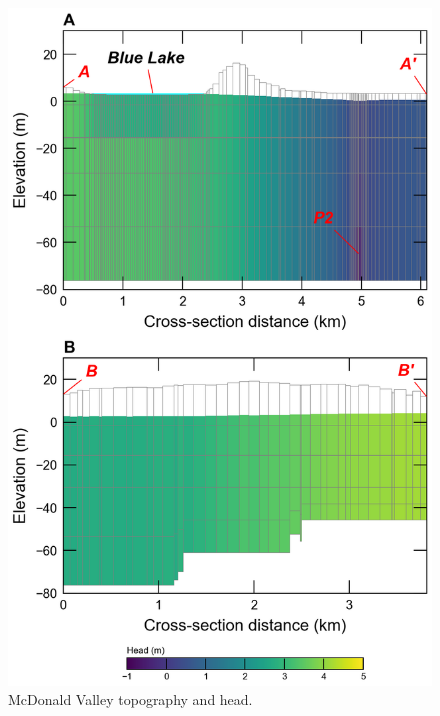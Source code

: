 \documentclass[11pt, oneside]{article}   	%
\begin{document}
\begin{figure}[ht!]
	\begin{center}
		\includegraphics{figures/mv_voronoi_xsection.png}
	\end{center}
	\caption{McDonald Valley topography and head.}
	\label{fig:mvxsection}
\end{figure}

\end{document}

